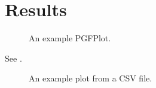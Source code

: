 \section{Results}
\label{sec:results}

\begin{figure}
  \centerline{}
  \caption{An example PGFPlot.}
  \label{fig:results:main}
\end{figure}

See .

\begin{figure*}
  \centerline{}
  \caption{An example plot from a CSV file.}
  \label{fig:results:trace}
\end{figure*}
